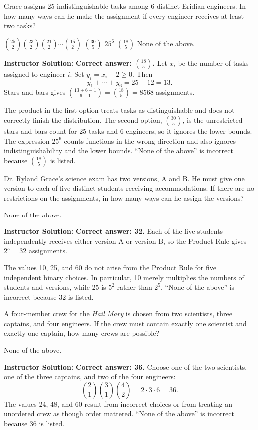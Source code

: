 \documentclass[11pt,addpoints]{exam}
\renewenvironment{solution}
{\par\medskip\noindent\hrulefill\par\smallskip\noindent\textbf{Instructor Solution:}\enspace\ignorespaces}
{\par\smallskip\noindent\hrulefill\par\medskip}
\begin{document}
\begin{questions}
\question[5] Grace assigns 25 indistinguishable tasks among 6 distinct Eridian engineers. In how many ways can he make the assignment if every engineer receives at least two tasks?
\begin{choices}
    \choice $\binom{25}{2}\binom{23}{2}\binom{21}{2}\cdots\binom{15}{2}$
    \choice $\binom{30}{5}$
    \choice $25^6$
    \CorrectChoice $\binom{18}{5}$
    \choice None of the above.
\end{choices}
\begin{solution}
\textbf{Correct answer: $\binom{18}{5}$.} Let $x_i$ be the number of tasks assigned to engineer $i$. Set $y_i=x_i-2\ge0$. Then
\[
y_1+\cdots+y_6=25-12=13.
\]
Stars and bars gives $\binom{13+6-1}{6-1}=\binom{18}{5}=8568$ assignments.

The product in the first option treats tasks as distinguishable and does not correctly finish the distribution. The second option, $\binom{30}{5}$, is the unrestricted stars-and-bars count for 25 tasks and 6 engineers, so it ignores the lower bounds. The expression $25^6$ counts functions in the wrong direction and also ignores indistinguishability and the lower bounds. ``None of the above'' is incorrect because $\binom{18}{5}$ is listed.
\end{solution}

\question[5] Dr. Ryland Grace's science exam has two versions, A and B. He must give one version to each of five distinct students receiving accommodations. If there are no restrictions on the assignments, in how many ways can he assign the versions?
\begin{choices}
    \choice None of the above.
\end{choices}
\begin{solution}
\textbf{Correct answer: 32.} Each of the five students independently receives either version A or version B, so the Product Rule gives $2^5=32$ assignments.

The values 10, 25, and 60 do not arise from the Product Rule for five independent binary choices. In particular, 10 merely multiplies the numbers of students and versions, while 25 is $5^2$ rather than $2^5$. ``None of the above'' is incorrect because 32 is listed.
\end{solution}

\question[5] A four-member crew for the \textit{Hail Mary} is chosen from two scientists, three captains, and four engineers. If the crew must contain exactly one scientist and exactly one captain, how many crews are possible?
\begin{choices}
    \choice None of the above.
\end{choices}
\begin{solution}
\textbf{Correct answer: 36.} Choose one of the two scientists, one of the three captains, and two of the four engineers:
\[
\binom21\binom31\binom42=2\cdot3\cdot6=36.
\]
The values 24, 48, and 60 result from incorrect choices or from treating an unordered crew as though order mattered. ``None of the above'' is incorrect because 36 is listed.
\end{solution}


\end{questions}
\end{document}
